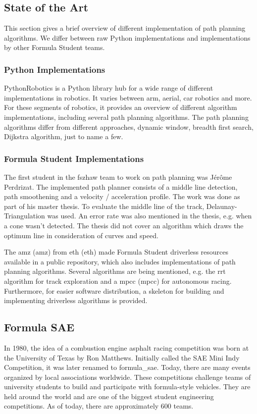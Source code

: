 \subsection{State of the Art}
This section gives a brief overview of different implementation of path planning algorithms. We differ between raw Python implementations and implementations by other Formula Student teams.

\subsubsection{Python Implementations}
PythonRobotics is a Python library hub for a wide range of different implementations in robotics. It varies between arm, aerial, car robotics and more.
For these segments of robotics, it provides an overview of different algorithm implementations, including several path planning algorithms.
The path planning algorithms differ from different approaches, dynamic window, breadth first search, Dijkstra algorithm, just to name a few. 
\cite{python_robotics}

\subsubsection{Formula Student Implementations}
The first student in the \acrshort{fszhaw} team to work on path planning was Jérôme Perdrizat. The implemented path planner consists of a middle line detection, path smoothening and a velocity / acceleration profile. The work was done as part of his master thesis. To evaluate the middle line of the track, Delaunay-Triangulation was used. An error rate was also mentioned in the thesis, e.g. when a cone wasn't detected. The thesis did not cover an algorithm which draws the optimum line in consideration of curves and speed.
\cite{autopilot_for_formula_student_jerome}

The \acrshort{amz} (\acrlong{amz}) from \acrshort{eth} (\acrlong{eth}) made Formula Student driverless resources available in a public repository, which also includes implementations of path planning algorithms. Several algorithms are being mentioned, e.g. the \acrshort{rrt} algorithm for track exploration and a \acrlong{mpcc} (\acrshort{mpcc}) for autonomous racing. Furthermore, for easier software distribution, a skeleton for building and implementing driverless algorithms is provided.
\cite{amz_racing_github}


\subsection{Formula SAE}
In 1980, the idea of a combustion engine asphalt racing competition was born at the University of Texas by Ron Matthews. Initially called the SAE Mini Indy Competition, it was later renamed to \Gls{formula_sae}. Today, there are many events organized by local associations worldwide.
\cite{formula_sae}
These competitions challenge teams of university students to build and participate with formula-style vehicles. They are held around the world and are one of the biggest student engineering competitions. As of today, there are approximately 600 teams. \cite{sae_student_events}

